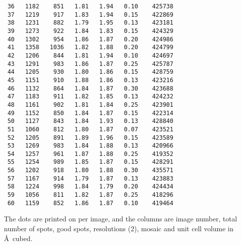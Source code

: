 \documentclass[a4paper, 11pt]{article}
\begin{document}
{\begin{verbatim}
 36   1182    851   1.81   1.94   0.10    425738
 37   1219    917   1.83   1.94   0.15    422869
 38   1231    882   1.79   1.95   0.13    423181
 39   1273    922   1.84   1.83   0.15    424329
 40   1302    954   1.86   1.87   0.20    424986
 41   1358   1036   1.82   1.88   0.20    424799
 42   1206    844   1.81   1.94   0.10    424697
 43   1291    983   1.86   1.87   0.25    425787
 44   1205    930   1.80   1.86   0.15    428759
 45   1151    910   1.88   1.86   0.13    423216
 46   1132    864   1.84   1.87   0.30    423688
 47   1183    911   1.82   1.85   0.13    424232
 48   1161    902   1.81   1.84   0.25    423901
 49   1152    850   1.84   1.87   0.15    422314
 50   1127    843   1.84   1.93   0.13    428840
 51   1060    812   1.80   1.87   0.07    423521
 52   1205    891   1.89   1.96   0.15    423589
 53   1269    983   1.84   1.88   0.13    420966
 54   1257    961   1.87   1.88   0.25    419352
 55   1254    989   1.85   1.87   0.15    428291
 56   1202    918   1.80   1.88   0.30    435571
 57   1167    914   1.79   1.87   0.13    423883
 58   1224    998   1.84   1.79   0.20    424434
 59   1056    811   1.82   1.87   0.25    418296
 60   1159    852   1.86   1.87   0.10    419464
\end{verbatim}
}

The dots are printed on per image, and the columns are image number, total 
number of spots, good spots, resolutions (2), mosaic and unit cell volume
in \AA\ cubed.
\end{document}
